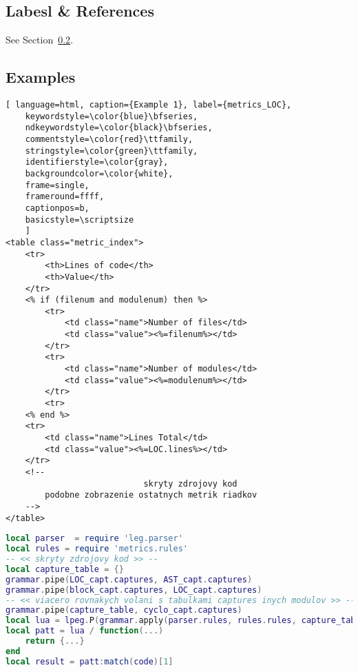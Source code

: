 \subsection{Labesl \& References}
See Section~\ref{lab:Examples}.

\subsection{Examples}
\label{lab:Examples}

\begin{lstlisting}[ language=html, caption={Example 1}, label={metrics_LOC},
	keywordstyle=\color{blue}\bfseries,
	ndkeywordstyle=\color{black}\bfseries,
	commentstyle=\color{red}\ttfamily,
	stringstyle=\color{green}\ttfamily,
	identifierstyle=\color{gray},
	backgroundcolor=\color{white}, 
	frame=single, 
	frameround=ffff,
	captionpos=b,
	basicstyle=\scriptsize
	]
<table class="metric_index">
	<tr>
		<th>Lines of code</th>
		<th>Value</th>
	</tr>
	<% if (filenum and modulenum) then %>
		<tr>
			<td class="name">Number of files</td>
			<td class="value"><%=filenum%></td>
		</tr>
		<tr>
			<td class="name">Number of modules</td>
			<td class="value"><%=modulenum%></td>
		</tr>
		<tr>
	<% end %>
	<tr>
		<td class="name">Lines Total</td>
		<td class="value"><%=LOC.lines%></td>
	</tr>
	<!--
							skryty zdrojovy kod
		podobne zobrazenie ostatnych metrik riadkov
	-->
</table>
\end{lstlisting}

\begin{lstlisting}[language=lua, caption={Názov}, label=metrics.pipe]
local parser  = require 'leg.parser'
local rules = require 'metrics.rules'
-- << skryty zdrojovy kod >> --
local capture_table = {}
grammar.pipe(LOC_capt.captures, AST_capt.captures)
grammar.pipe(block_capt.captures, LOC_capt.captures)
-- << viacero rovnakych volani s tabulkami captures inych modulov >> --
grammar.pipe(capture_table, cyclo_capt.captures)
local lua = lpeg.P(grammar.apply(parser.rules, rules.rules, capture_table))
local patt = lua / function(...) 
	return {...} 
end
local result = patt:match(code)[1]
\end{lstlisting}

